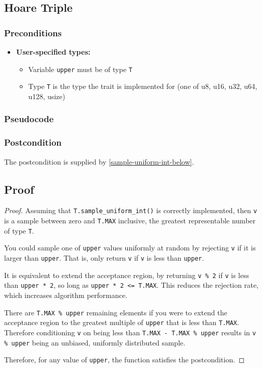 \documentclass{article}
\begin{document}
\subsection{Hoare Triple}
\subsubsection*{Preconditions}
\begin{itemize}
    \item \textbf{User-specified types:}
    \begin{itemize}
        \item Variable \texttt{upper} must be of type \texttt{T}
        \item Type \texttt{T} is the type the trait is implemented for (one of u8, u16, u32, u64, u128, usize)
    \end{itemize}
\end{itemize}

\subsubsection*{Pseudocode}



\subsubsection*{Postcondition}
The postcondition is supplied by \ref{sample-uniform-int-below}.

\subsection{Proof}
\begin{proof} 
\label{unsigned-integer-proof}
Assuming that \texttt{T.sample\_uniform\_int()} is correctly implemented,
then \texttt{v} is a sample between zero and \texttt{T.MAX} inclusive, the greatest representable number of type \texttt{T}.

You could sample one of \texttt{upper} values uniformly at random by rejecting \texttt{v} if it is larger than \texttt{upper}.
That is, only return \texttt{v} if \texttt{v} is less than \texttt{upper}.

It is equivalent to extend the acceptance region, 
by returning \texttt{v \% 2} if \texttt{v} is less than \texttt{upper * 2}, 
so long as \texttt{upper * 2 <= T.MAX}.
This reduces the rejection rate, which increases algorithm performance.

There are \texttt{T.MAX \% upper} remaining elements if you were to 
extend the acceptance region to the greatest multiple of \texttt{upper} that is less than \texttt{T.MAX}.
Therefore conditioning \texttt{v} on being less than \texttt{T.MAX - T.MAX \% upper} 
results in \texttt{v \% upper} being an unbiased, uniformly distributed sample.

\noindent Therefore, for any value of \texttt{upper}, the function satisfies the postcondition.
\end{proof}
\end{document}
